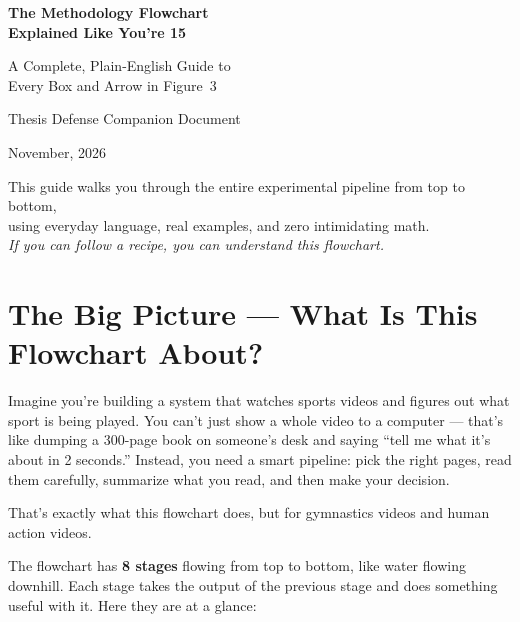 \documentclass[12pt, a4paper]{article}
\begin{document}
\begin{titlepage}
\centering
\vspace*{3cm}
{\Huge\bfseries\color{stageblue} The Methodology Flowchart\\[0.3cm]
Explained Like You're 15\par}
\vspace{1.5cm}
{\Large A Complete, Plain-English Guide to\\Every Box and Arrow in Figure~3\par}
\vspace{2cm}
{\large Thesis Defense Companion Document\par}
\vspace{0.5cm}
{\large November, 2026\par}
\vspace{3cm}
{\normalsize
This guide walks you through the entire experimental pipeline from top to bottom,\\
using everyday language, real examples, and zero intimidating math.\\[0.5cm]
\textit{If you can follow a recipe, you can understand this flowchart.}}
\end{titlepage}

\tableofcontents
\newpage

\section{The Big Picture — What Is This Flowchart About?}

\begin{analogybox}
Imagine you're building a system that watches sports videos and figures out what sport is being played. You can't just show a whole video to a computer — that's like dumping a 300-page book on someone's desk and saying ``tell me what it's about in 2 seconds.'' Instead, you need a smart pipeline: pick the right pages, read them carefully, summarize what you read, and then make your decision.

That's exactly what this flowchart does, but for gymnastics videos and human action videos.
\end{analogybox}

The flowchart has \textbf{8 stages} flowing from top to bottom, like water flowing downhill. Each stage takes the output of the previous stage and does something useful with it. Here they are at a glance:
\end{document}
